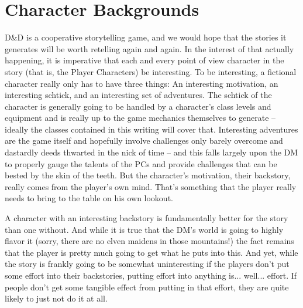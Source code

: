 \section{Character Backgrounds}
\vspace*{-10pt}

D\&D is a cooperative storytelling game, and we would hope that the stories it generates will be worth retelling again and again. In the interest of that actually happening, it is imperative that each and every point of view character in the story (that is, the Player Characters) be interesting. To be interesting, a fictional character really only has to have three things: An interesting motivation, an interesting schtick, and an interesting set of adventures. The schtick of the character is generally going to be handled by a character's class levels and equipment and is really up to the game mechanics themselves to generate -- ideally the classes contained in this writing will cover that. Interesting adventures are the game itself and hopefully involve challenges only barely overcome and dastardly deeds thwarted in the nick of time -- and this falls largely upon the DM to properly gauge the talents of the PCs and provide challenges that can be bested by the skin of the teeth. But the character's motivation, their backstory, really comes from the player's own mind. That's something that the player really needs to bring to the table on his own lookout.

A character with an interesting backstory is fundamentally better for the story than one without. And while it is true that the DM's world is going to highly flavor it (sorry, there are no elven maidens in those mountains!) the fact remains that the player is pretty much going to get what he puts into this. And yet, while the story is frankly going to be somewhat uninteresting if the players don't put some effort into their backstories, putting effort into anything is... well... effort. If people don't get some tangible effect from putting in that effort, they are quite likely to just not do it at all.

